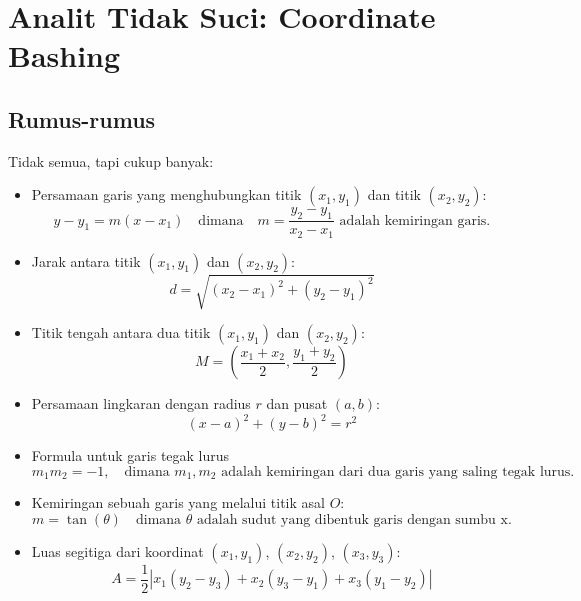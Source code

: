 \documentclass[11pt]{scrartcl}
\begin{document}
\section{Analit Tidak Suci: Coordinate Bashing}
\subsection{Rumus-rumus}
Tidak semua, tapi cukup banyak:
\begin{itemize}
    \item Persamaan garis yang menghubungkan titik $(x_1, y_1)$ dan titik $(x_2, y_2)$:
    \[ y - y_1 = m(x - x_1) \quad \text{dimana} \quad m = \frac{y_2 - y_1}{x_2 - x_1} \text{ adalah kemiringan garis.} \]
    
    \item Jarak antara titik $(x_1, y_1)$ dan $(x_2, y_2)$:
    \[ d = \sqrt{(x_2 - x_1)^2 + (y_2 - y_1)^2} \]
    
    \item Titik tengah antara dua titik $(x_1, y_1)$ dan $(x_2, y_2)$:
    \[ M = \left(\frac{x_1 + x_2}{2}, \frac{y_1 + y_2}{2}\right) \]
    
    \item Persamaan lingkaran dengan radius $r$ dan pusat $(a, b)$:
    \[ (x - a)^2 + (y - b)^2 = r^2 \]
    
    \item Formula untuk garis tegak lurus
    \[ m_1m_2 = -1, \quad \text{dimana } m_1, m_2 \text{ adalah kemiringan dari dua garis yang saling tegak lurus.} \]
    
    \item Kemiringan sebuah garis yang melalui titik asal $O$:
    \[ m = \tan(\theta) \quad \text{dimana } \theta \text{ adalah sudut yang dibentuk garis dengan sumbu x.} \]
    
    \item Luas segitiga dari koordinat $(x_1, y_1)$, $(x_2, y_2)$, $(x_3, y_3)$:
    \[ A = \frac{1}{2} 
    \left| 
    x_1(y_2 - y_3) + x_2(y_3 - y_1) + x_3(y_1 - y_2) 
    \right| \]
\end{itemize}
\end{document}
